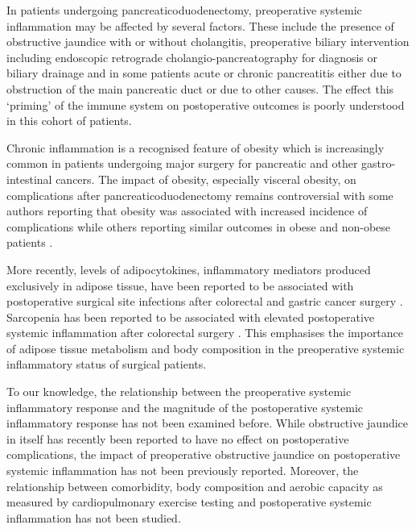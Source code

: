 In patients undergoing pancreaticoduodenectomy, preoperative systemic inflammation may be affected by several factors. 
These include the presence of obstructive jaundice with or without cholangitis, preoperative biliary intervention including endoscopic retrograde cholangio-pancreatography for diagnosis or biliary drainage and in some patients acute or chronic pancreatitis either due to obstruction of the main pancreatic duct or due to other causes. 
The effect this `priming' of the immune system on postoperative outcomes is poorly understood in this cohort of patients. 

Chronic inflammation is a recognised feature of obesity which is increasingly common in patients undergoing major surgery for pancreatic and other gastro-intestinal cancers. 
The impact of obesity, especially visceral obesity, on complications after pancreaticoduodenectomy remains controversial with some authors reporting that obesity was associated with increased incidence of complications \parencite{house_preoperative_2008, ramsey_body_2011} while others reporting similar outcomes in obese and non-obese patients \parencite{khan_does_2010, tsai_impact_2010, balentine_obesity_2011}. 

More recently, levels of adipocytokines, inflammatory mediators produced exclusively in adipose tissue, have been reported to be associated with postoperative surgical site infections after colorectal \parencite{ortega-deballon_preoperative_2013, matsuda_preoperative_2009} and gastric cancer surgery \parencite{yamamoto_association_2013}.
Sarcopenia has been reported to be associated with  elevated postoperative systemic inflammation after colorectal surgery \parencite{reisinger_sarcopenia_2015}.
This emphasises the importance of adipose tissue metabolism and body composition in the preoperative systemic inflammatory status of surgical patients. 


To our knowledge, the relationship between the preoperative systemic inflammatory response and the magnitude of the postoperative systemic inflammatory response has not been examined before. 
While obstructive jaundice in itself has recently been reported to have no effect on postoperative complications, the impact of preoperative obstructive jaundice on postoperative systemic inflammation has not been previously reported. 
Moreover, the relationship between comorbidity, body composition and aerobic capacity as measured by cardiopulmonary exercise testing and postoperative systemic inflammation has not been studied. 


